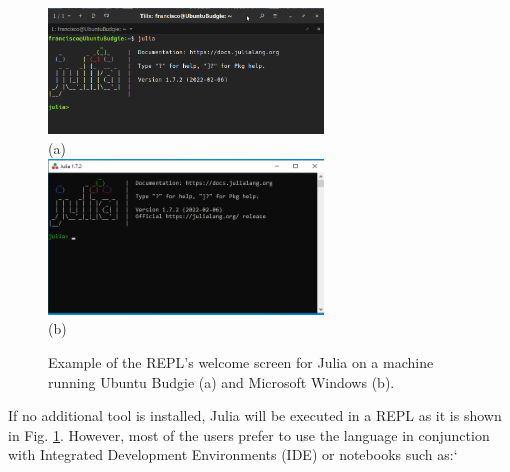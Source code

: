 \begin{figure}
	\centering
	\includegraphics[width=0.65\textwidth]{fig/Julia_REPL} 
	\\(a)\\
	\vspace{1cm}
	\includegraphics[width=0.65\textwidth]{fig/julia_in_windows}
	\\(b)\\
	\caption{Example of the REPL's welcome screen for Julia on a machine running Ubuntu Budgie (a) and Microsoft Windows (b).}
	\label{Fig;JuliaREPL}
\end{figure}
%
If no additional tool is installed, Julia will be executed in a REPL as it is shown in Fig. \ref{Fig;JuliaREPL}. However, most of the users prefer to use the language in conjunction with Integrated Development Environments (IDE) or notebooks such as:`

